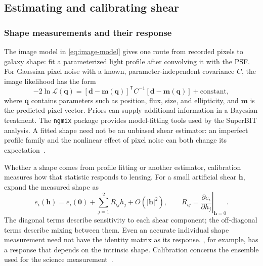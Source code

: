 \subsection{Estimating and calibrating shear}
\label{sec:calibration}

\subsubsection{Shape measurements and their response}


The image model in \cref{eq:image-model} gives one route from recorded pixels to galaxy shape: fit a parameterized light profile after convolving it with the PSF. For Gaussian pixel noise with a known, parameter-independent covariance $C$, the image likelihood has the form
\begin{equation}
    -2\ln\mathcal{L}(\boldsymbol{q})=
    [\boldsymbol{d}-\boldsymbol{m}(\boldsymbol{q})]^{\mathsf T}
    C^{-1}[\boldsymbol{d}-\boldsymbol{m}(\boldsymbol{q})]+\mathrm{constant},
    \label{eq:likelihood}
\end{equation}
where $\boldsymbol{q}$ contains parameters such as position, flux, size, and ellipticity, and $\boldsymbol{m}$ is the predicted pixel vector. Priors can supply additional information in a Bayesian treatment. The \texttt{ngmix} package provides model-fitting tools used by the SuperBIT analysis. A fitted shape need not be an unbiased shear estimator: an imperfect profile family and the nonlinear effect of pixel noise can both change its expectation~\cite{sheldon_implementation_2014,refregier_noise_2012}.

Whether a shape comes from profile fitting or another estimator, calibration measures how that statistic responds to lensing. For a small artificial shear $\boldsymbol{h}$, expand the measured shape as
\begin{equation}
    e_i(\boldsymbol{h})=e_i(\boldsymbol{0})
    +\sum_{j=1}^{2}R_{ij}h_j+O(|\boldsymbol{h}|^2),
    \qquad
    R_{ij}=\left.\frac{\partial e_i}{\partial h_j}\right|_{\boldsymbol{h}=0}.
    \label{eq:response}
\end{equation}
The diagonal terms describe sensitivity to each shear component; the off-diagonal terms describe mixing between them. Even an accurate individual shape measurement need not have the identity matrix as its response. , for example, has a response that depends on the intrinsic shape. Calibration concerns the ensemble used for the science measurement~\cite{schneider_weak_2006,sheldon_practical_2017}.

